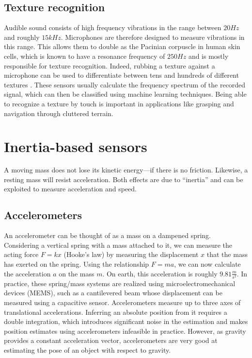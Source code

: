 \subsection{Texture recognition}

Audible sound consists of high frequency vibrations in the range between $20Hz$ and roughly $15kHz$. Microphones are therefore designed to measure vibrations in this range. This allows them to double as the Pacinian corpuscle in human skin cells, which is known to have a resonance frequency of $250Hz$ and is mostly responsible for texture recognition. Indeed, rubbing a texture against a microphone can be used to differentiate between tens and hundreds of different textures \cite{hughes14}. These sensors usually calculate the frequency spectrum of the recorded signal, which can then be classified using machine learning techniques. Being able to recognize a texture by touch is important in applications like grasping and navigation through cluttered terrain.

\section{Inertia-based sensors}\label{sec:sensors:inertia}

A moving mass does not lose its kinetic energy---if there is no friction. Likewise, a resting mass will resist acceleration. Both effects are due to ``inertia''  and can be exploited to measure acceleration and speed.

\subsection{Accelerometers}

An accelerometer can be thought of as a mass on a dampened spring. Considering a vertical spring with a mass attached to it, we can measure the acting force $F=kx$ (Hooke's law) by measuring the displacement $x$ that the mass has exerted on the spring.
Using the relationship $F=ma$, we can now calculate the acceleration $a$ on the mass $m$. On earth, this acceleration is roughly $9.81\frac{m}{s^2}$.
In practice, these spring/mass systems are realized using microelectromechanical devices (MEMS), such as a cantilevered beam whose displacement can be measured using a capacitive sensor. Accelerometers measure up to three axes of translational accelerations. Inferring an absolute position from it requires a double integration, which introduces significant noise in the estimation and makes position estimates using accelerometers infeasible in practice.
However, as gravity provides a constant acceleration vector, accelerometers are very good at estimating the pose of an object with respect to gravity.

